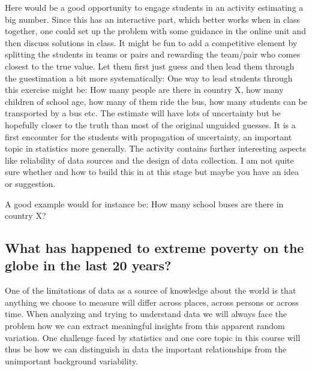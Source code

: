 \documentclass[
  letterpaper,
]{scrbook}
\begin{document}
\begin{tcolorbox}[enhanced jigsaw, toprule=.15mm, colbacktitle=quarto-callout-caution-color!10!white, breakable, coltitle=black, rightrule=.15mm, bottomtitle=1mm, bottomrule=.15mm, titlerule=0mm, title=\textcolor{quarto-callout-caution-color}{\faFire}\hspace{0.5em}{Comment for Seitwerk: Please uncollapse}, arc=.35mm, leftrule=.75mm, toptitle=1mm, left=2mm, opacityback=0, opacitybacktitle=0.6, colframe=quarto-callout-caution-color-frame, colback=white]
Here would be a good opportunity to engage students in an activity
estimating a big number. Since this has an interactive part, which
better works when in class together, one could set up the problem with
some guidance in the online unit and then discuss solutions in class. It
might be fun to add a competitive element by splitting the students in
teams or pairs and rewarding the team/pair who comes closest to the true
value. Let them first just guess and then lead them through the
guestimation a bit more systematically: One way to lead students through
this exercise might be: How many people are there in country X, how many
children of school age, how many of them ride the bus, how many students
can be transported by a bus etc. The estimate will have lots of
uncertainty but be hopefully closer to the truth than most of the
original unguided guesses. It is a first encounter for the students with
propagation of uncertainty, an important topic in statistics more
generally. The activity contains further interesting aspects like
reliability of data sources and the design of data collection. I am not
quite sure whether and how to build this in at this stage but maybe you
have an idea or suggestion.

A good example would for instance be: How many school buses are there in
country X?
\end{tcolorbox}

\hypertarget{what-has-happened-to-extreme-poverty-on-the-globe-in-the-last-20-years}{%
\subsection{What has happened to extreme poverty on the globe in the
last 20
years?}\label{what-has-happened-to-extreme-poverty-on-the-globe-in-the-last-20-years}}

One of the limitations of data as a source of knowledge about the world
is that anything we choose to measure will differ across places, across
persons or across time. When analyzing and trying to understand data we
will always face the problem how we can extract meaningful insights from
this apparent random variation. One challenge faced by statistics and
one core topic in this course will thus be how we can distinguish in
data the important relationships from the unimportant background
variability.
\end{document}
